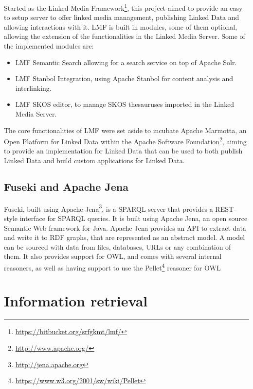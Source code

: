 Started as the Linked Media Framework\footnote{\url{https://bitbucket.org/srfgkmt/lmf/}}, this project aimed to provide an easy to setup server to offer linked media management, publishing Linked Data and allowing interactions with it. \ac{LMF} is built in modules, some of them optional, allowing the extension of the functionalities in the Linked Media Server. Some of the implemented modules are:

\begin{itemize}%
  \item \ac{LMF} Semantic Search allowing for a search service on top of Apache Solr. 
  \item \ac{LMF} Stanbol Integration, using Apache Stanbol for content analysis and interlinking.
  \item \ac{LMF} SKOS editor, to manage SKOS thesauruses imported in the Linked Media Server.
\end{itemize}

The core functionalities of \ac{LMF} were set aside to incubate Apache Marmotta, an Open Platform for Linked Data within the Apache Software Foundation\footnote{\url{http://www.apache.org/}}, aiming to provide an implementation for Linked Data that can be used to both publish Linked Data and build custom applications for Linked Data.

\subsection{Fuseki and Apache Jena}

Fuseki, built using Apache Jena\footnote{\url{http://jena.apache.org}}, is a \ac{SPARQL} server that provides a REST-style interface for \ac{SPARQL} queries. It is built using Apache Jena, an open source Semantic Web framework for Java. Apache Jena provides an API to extract data and write it to \ac{RDF} graphs, that are represented as an abstract model. A model can be sourced with data from files, databases, URLs or any combination of them. It also provides support for \ac{OWL}, and comes with several internal reasoners, as well as having support to use the Pellet\footnote{\url{https://www.w3.org/2001/sw/wiki/Pellet}} reasoner for \ac{OWL}


\section{Information retrieval}

